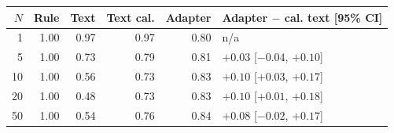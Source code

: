 \begin{tabular}{rrrrrl}
\toprule
$N$ & Rule & Text & Text cal. & Adapter & Adapter $-$ cal. text [95\% CI] \\
\midrule
1 & 1.00 & 0.97 & 0.97 & 0.80 & n/a \\
5 & 1.00 & 0.73 & 0.79 & 0.81 & $+0.03$ [$-0.04$, $+0.10$] \\
10 & 1.00 & 0.56 & 0.73 & 0.83 & $+0.10$ [$+0.03$, $+0.17$] \\
20 & 1.00 & 0.48 & 0.73 & 0.83 & $+0.10$ [$+0.01$, $+0.18$] \\
50 & 1.00 & 0.54 & 0.76 & 0.84 & $+0.08$ [$-0.02$, $+0.17$] \\
\bottomrule
\end{tabular}
